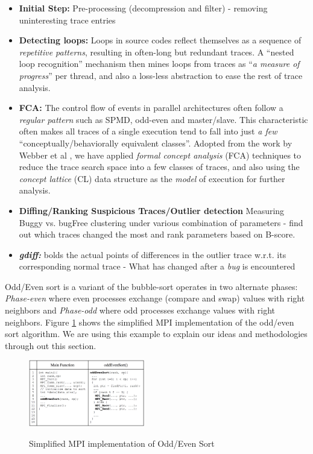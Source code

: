 \begin{itemize}
	\item \textbf{Initial Step:} Pre-processing (decompression and filter) - removing
uninteresting trace entries
	\item \textbf{Detecting loops:} Loops in source codes reflect themselves as a sequence of \textit{repetitive patterns}, resulting in often-long but redundant traces. A ``nested loop  recognition'' mechanism then mines loops from traces as ``\textit{a measure of progress}'' per thread, and also a loss-less abstraction to ease the rest of trace analysis.
%
	\item \textbf{FCA:} The control flow of events in parallel architectures often follow a \textit{regular pattern} such as SPMD, odd-even and master/slave. This characteristic often makes all traces of a single execution tend to fall into just \textit{a few} ``conceptually/behaviorally equivalent classes''. Adopted from the work by Webber et al \cite{weberStructural}, we have applied \textit{formal concept analysis} (FCA)\cite{clbook} techniques to reduce the trace search space into a few classes of traces, and also using the \textit{concept lattice} (CL) data structure as the \textit{model} of execution for further analysis.
	\item \textbf{Diffing/Ranking Suspicious Traces/Outlier detection} Measuring Buggy vs. bugFree clustering under various combination of parameters - find out which traces changed the most and rank parameters based on B-score.
	\item \textit{\textbf{gdiff:}} bolds the actual points of differences
in the outlier trace w.r.t. its corresponding normal trace - What has changed after a \textit{bug} is encountered
\end{itemize}

Odd/Even sort is a variant of the bubble-sort operates in two alternate phases: \textit{Phase-even} where even processes exchange (compare and swap) values with right neighbors and \textit{Phase-odd} where odd processes exchange values with right neighbors. Figure \ref{fig.oddEven} shows the simplified MPI implementation of the odd/even sort algorithm. We are using this example to explain our ideas and methodologies through out this section.



\begin{figure}[]
\centering
\caption{Simplified MPI implementation of Odd/Even Sort}
\includegraphics[width=0.45\textwidth]{figs/oddEven.png}
\label{fig.oddEven}
\end{figure}



